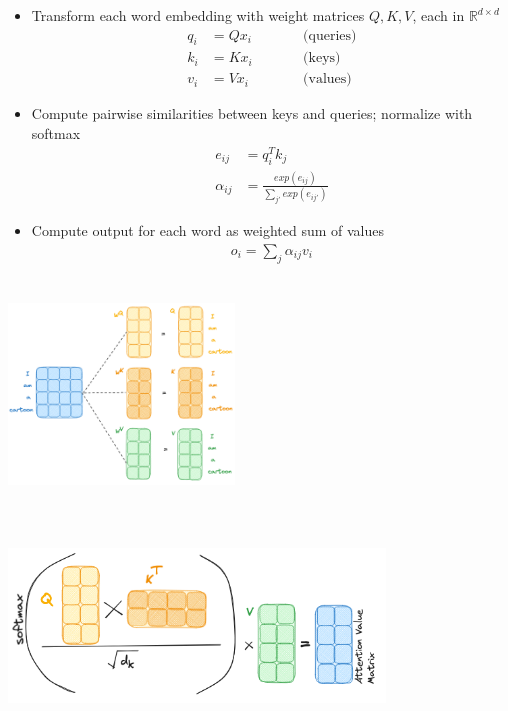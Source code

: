 \documentclass{article}
\begin{document}
\begin{itemize}
    \item Transform each word embedding with weight matrices $Q,K,V$, each in $\mathbb{R}^{d \times d}$
        \begin{align*}
            q_i &= Q x_i &\qquad & \text{(queries)} \\
            k_i &= K x_i && \text{(keys)} \\
            v_i &= V x_i && \text{(values)} 
        \end{align*}
    \item Compute pairwise similarities between keys and queries; normalize with softmax
        \begin{align*}
            e_{ij} &= q_i^T k_j \\
            \alpha_{ij} &= \frac{exp(e_{ij})}{\sum_{j'} exp(e_{ij'})}
        \end{align*}
    \item Compute output for each word as weighted sum of values
        \begin{align*}
            o_i = \sum_j \alpha_{ij} v_i 
        \end{align*}
\end{itemize}
\includegraphics[width=6cm, height=6cm]{Transformer/Images/Attention5.png} \\
\includegraphics[width=10cm, height=6cm]{Transformer/Images/Attention6.png}
\begin{align*}
    
\end{align*}
\end{document}
